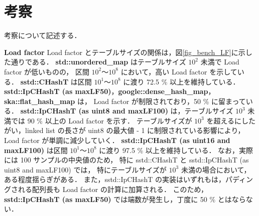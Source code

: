 \chapter{考察}
\label{chap_Discussion}

考察について記述する．
\leavevmode \newline

%
{\bf Load factor}
\samepage\newline\indent
Load factor とテーブルサイズの関係は，図\ref{fig_bench_LF}に示した通りである．
{\bf std::unordered\_map} はテーブルサイズ $10^2$ 未満で Load factor が低いものの，
区間 $10^2〜10^8$ において，高い Load factor を示している．
{\bf sstd::CHashT} は区間 $10^1〜10^8$ に渡り 72.5 \% 以上を維持している．
{\bf sstd::IpCHashT (as maxLF50)}，{\bf google::dense\_hash\_map}，{\bf ska::flat\_hash\_map} は，
Load factor が制限されており，50 \% に留まっている．
{\bf sstd::IpCHashT (as uint8 and maxLF100)} は，テーブルサイズ $10^3$ 未満では 90 \% 以上の Load factor を示す．
テーブルサイズが $10^3$ を超えるにしたがい，linked list の長さが uint8 の最大値 - 1 に制限されている影響により，
Load factor が単調に減少していく．
{\bf sstd::IpCHashT (as uint16 and maxLF100)} は区間 $10^1〜10^8$ に渡り 97.5 \% 以上を維持している．
なお，実際には 100 サンプルの中央値のため，
特に sstd::CHashT と sstd::IpCHashT (as uint8 and maxLF100) では，
特にテーブルサイズが $10^3$ 未満の場合において，ある程度揺らぎがある．
また，sstd::IpCHashT の実装はいずれもは，パディングされる配列長も Load factor の計算に加算される．
このため，{\bf sstd::IpCHashT (as maxLF50)} では端数が発生し，丁度に 50 \% とはならない．
\leavevmode \newline


